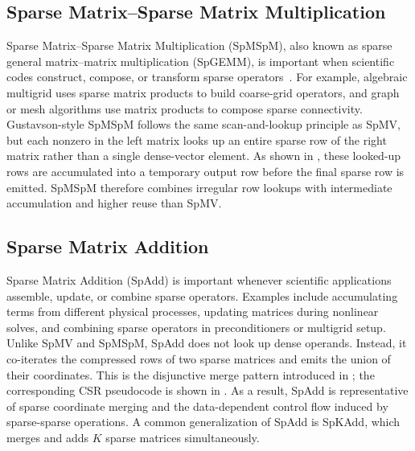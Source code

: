 

\subsection{Sparse Matrix--Sparse Matrix Multiplication} \label{sec:background-spmspm} %

Sparse Matrix--Sparse Matrix Multiplication (SpMSpM), also known as sparse general matrix--matrix multiplication (SpGEMM), is important when scientific codes construct, compose, or transform sparse operators~\cite{gao2023systematic}. For example, algebraic multigrid uses sparse matrix products to build coarse-grid operators, and graph or mesh algorithms use matrix products to compose sparse connectivity. Gustavson-style SpMSpM follows the same scan-and-lookup principle as SpMV, but each nonzero in the left matrix looks up an entire sparse row of the right matrix rather than a single dense-vector element. As shown in , these looked-up rows are accumulated into a temporary output row before the final sparse row is emitted. SpMSpM therefore combines irregular row lookups with intermediate accumulation and higher reuse than SpMV.



\subsection{Sparse Matrix Addition} \label{sec:background-spadd} %

Sparse Matrix Addition (SpAdd) is important whenever scientific applications assemble, update, or combine sparse operators. Examples include accumulating terms from different physical processes, updating matrices during nonlinear solves, and combining sparse operators in preconditioners or multigrid setup. Unlike SpMV and SpMSpM, SpAdd does not look up dense operands. Instead, it co-iterates the compressed rows of two sparse matrices and emits the union of their coordinates. This is the disjunctive merge pattern introduced in ; the corresponding CSR pseudocode is shown in . As a result, SpAdd is representative of sparse coordinate merging and the data-dependent control flow induced by sparse-sparse operations. A common generalization of SpAdd is SpKAdd, which merges and adds $K$ sparse matrices simultaneously.

